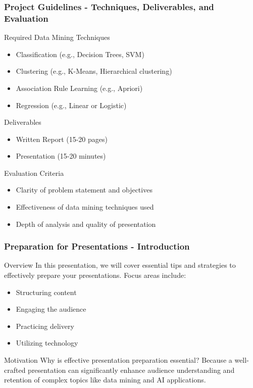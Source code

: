 \documentclass[aspectratio=169]{beamer}
\begin{document}
\begin{frame}[fragile]
    \frametitle{Project Guidelines - Techniques, Deliverables, and Evaluation}
    \begin{block}{Required Data Mining Techniques}
        \begin{itemize}
            \item Classification (e.g., Decision Trees, SVM)
            \item Clustering (e.g., K-Means, Hierarchical clustering)
            \item Association Rule Learning (e.g., Apriori)
            \item Regression (e.g., Linear or Logistic)
        \end{itemize}
    \end{block}

    \begin{block}{Deliverables}
        \begin{itemize}
            \item Written Report (15-20 pages)
            \item Presentation (15-20 minutes)
        \end{itemize}
    \end{block}
    
    \begin{block}{Evaluation Criteria}
        \begin{itemize}
            \item Clarity of problem statement and objectives
            \item Effectiveness of data mining techniques used
            \item Depth of analysis and quality of presentation
        \end{itemize}
    \end{block}
\end{frame}

\begin{frame}[fragile]
    \frametitle{Preparation for Presentations - Introduction}
    \begin{block}{Overview}
        In this presentation, we will cover essential tips and strategies to effectively prepare your presentations. 
        Focus areas include:
        \begin{itemize}
            \item Structuring content
            \item Engaging the audience
            \item Practicing delivery
            \item Utilizing technology
        \end{itemize}
    \end{block}
    
    \begin{block}{Motivation}
        Why is effective presentation preparation essential? 
        Because a well-crafted presentation can significantly enhance audience understanding and retention of complex topics like data mining and AI applications.
    \end{block}
\end{frame}
\end{document}
